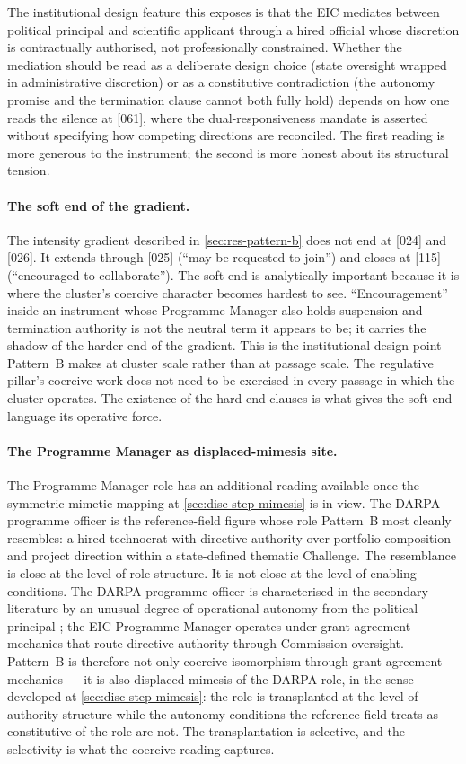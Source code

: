 The institutional design feature this exposes is that the EIC mediates
between political principal and scientific applicant through a hired
official whose discretion is contractually authorised, not
professionally constrained. Whether the mediation should be read as a
deliberate design choice (state oversight wrapped in administrative
discretion) or as a constitutive contradiction (the autonomy promise
and the termination clause cannot both fully hold) depends on how one
reads the silence at [061], where the dual-responsiveness mandate is
asserted without specifying how competing directions are reconciled.
The first reading is more generous to the instrument; the second is
more honest about its structural tension.

\paragraph{The soft end of the gradient.}
The intensity gradient described in \cref{sec:res-pattern-b} does not
end at [024] and [026]. It extends through [025] (\enquote{may be
requested to join}) and closes at [115] (\enquote{encouraged to
collaborate}). The soft end is analytically important because it is
where the cluster's coercive character becomes hardest to see.
\enquote{Encouragement} inside an instrument whose Programme Manager
also holds suspension and termination authority is not the neutral
term it appears to be; it carries the shadow of the harder end of the
gradient. This is the institutional-design point Pattern~B makes at
cluster scale rather than at passage scale. The regulative pillar's
coercive work does not need to be exercised in every passage in which
the cluster operates. The existence of the hard-end clauses is what
gives the soft-end language its operative force.

\paragraph{The Programme Manager as displaced-mimesis site.}
The Programme Manager role has an additional reading available once
the symmetric mimetic mapping at \cref{sec:disc-step-mimesis} is in
view. The DARPA programme officer is the reference-field figure whose
role Pattern~B most cleanly resembles: a hired technocrat with
directive authority over portfolio composition and project direction
within a state-defined thematic Challenge. The resemblance is close at
the level of role structure. It is not close at the level of
enabling conditions. The DARPA programme officer is characterised in
the secondary literature by an unusual degree of operational autonomy
from the political principal
\parencite{bonvillian2018darpa}; the EIC Programme Manager operates
under grant-agreement mechanics that route directive authority through
Commission oversight. Pattern~B is therefore not only coercive
isomorphism through grant-agreement mechanics --- it is also
displaced mimesis of the DARPA role, in the sense developed at
\cref{sec:disc-step-mimesis}: the role is transplanted at the level of
authority structure while the autonomy conditions the reference field
treats as constitutive of the role are not. The transplantation is
selective, and the selectivity is what the coercive reading captures.

